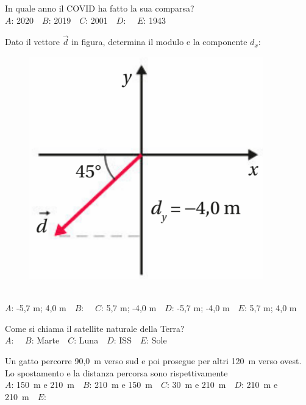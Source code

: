\mcquestionfooter



\def\mcquestionnumber{2}


\mcquestionheader In quale anno il COVID ha fatto la sua comparsa?\\
{$A$}: 2020\ \ {$B$}: 2019\ \ {$C$}: 2001\ \ {$D$}: \ \ {$E$}: 1943\ \ 

\mcquestionfooter



\def\mcquestionnumber{3}


\mcquestionheader Dato il vettore $\vec{d}$ in figura, determina il modulo e la componente $d_x$: \begin{figure}[h!]   \begin{center}     \includegraphics[scale=0.35]{vettored.png}   \end{center} \end{figure}\\
{$A$}: -5,7 m; 4,0 m\ \ {$B$}: \ \ {$C$}: 5,7 m; -4,0 m\ \ {$D$}: -5,7 m; -4,0 m\ \ {$E$}: 5,7 m; 4,0 m\ \ 

\mcquestionfooter



\def\mcquestionnumber{4}


\mcquestionheader Come si chiama il satellite naturale della Terra?\\
{$A$}: \ \ {$B$}: Marte\ \ {$C$}: Luna\ \ {$D$}: ISS\ \ {$E$}: Sole\ \ 

\mcquestionfooter



\def\mcquestionnumber{5}


\mcquestionheader Un gatto percorre 90,0~m verso sud e poi prosegue per altri 120~m verso ovest. Lo spostamento e la distanza percorsa sono rispettivamente\\
{$A$}: 150~m e 210~m\ \ {$B$}: 210~m e 150~m\ \ {$C$}: 30~m e 210~m\ \ {$D$}: 210~m e 210~m\ \ {$E$}: \ \ 

